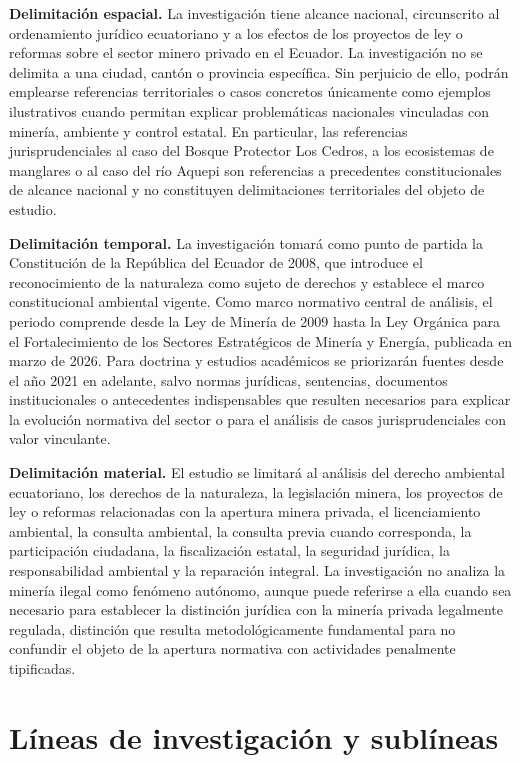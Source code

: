 \textbf{Delimitación espacial.} La investigación tiene alcance nacional, circunscrito al ordenamiento jurídico ecuatoriano y a los efectos de los proyectos de ley o reformas sobre el sector minero privado en el Ecuador. La investigación no se delimita a una ciudad, cantón o provincia específica. Sin perjuicio de ello, podrán emplearse referencias territoriales o casos concretos únicamente como ejemplos ilustrativos cuando permitan explicar problemáticas nacionales vinculadas con minería, ambiente y control estatal. En particular, las referencias jurisprudenciales al caso del Bosque Protector Los Cedros, a los ecosistemas de manglares o al caso del río Aquepi son referencias a precedentes constitucionales de alcance nacional y no constituyen delimitaciones territoriales del objeto de estudio.

\textbf{Delimitación temporal.} La investigación tomará como punto de partida la Constitución de la República del Ecuador de 2008, que introduce el reconocimiento de la naturaleza como sujeto de derechos y establece el marco constitucional ambiental vigente. Como marco normativo central de análisis, el periodo comprende desde la Ley de Minería de 2009 hasta la Ley Orgánica para el Fortalecimiento de los Sectores Estratégicos de Minería y Energía, publicada en marzo de 2026. Para doctrina y estudios académicos se priorizarán fuentes desde el año 2021 en adelante, salvo normas jurídicas, sentencias, documentos institucionales o antecedentes indispensables que resulten necesarios para explicar la evolución normativa del sector o para el análisis de casos jurisprudenciales con valor vinculante.

\textbf{Delimitación material.} El estudio se limitará al análisis del derecho ambiental ecuatoriano, los derechos de la naturaleza, la legislación minera, los proyectos de ley o reformas relacionadas con la apertura minera privada, el licenciamiento ambiental, la consulta ambiental, la consulta previa cuando corresponda, la participación ciudadana, la fiscalización estatal, la seguridad jurídica, la responsabilidad ambiental y la reparación integral. La investigación no analiza la minería ilegal como fenómeno autónomo, aunque puede referirse a ella cuando sea necesario para establecer la distinción jurídica con la minería privada legalmente regulada, distinción que resulta metodológicamente fundamental para no confundir el objeto de la apertura normativa con actividades penalmente tipificadas.

\section{Líneas de investigación y sublíneas}

